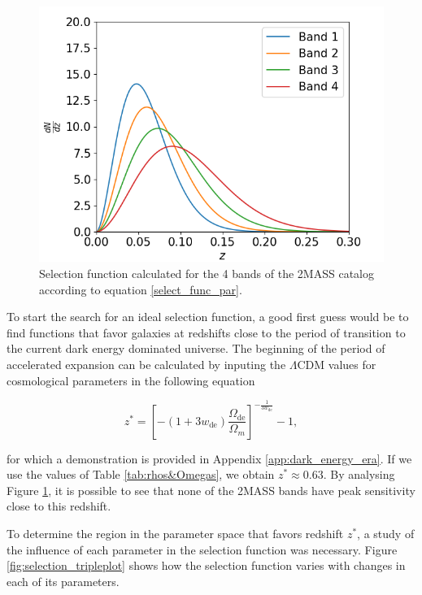 \documentclass[openany,a4paper,12pt,oneside]{book}
\begin{document}
\begin{spacing}{1.5}
\begin{figure}[!htb]
	\centering
	\includegraphics[width=.7\linewidth]{Imagens/selection_2MASS.png}
	\caption{Selection function calculated for the 4 bands of the 2MASS catalog according to equation \eqref{select_func_par}.}
	\label{fig:2MASS_selections}
\end{figure}

To start the search for an ideal selection function, a good first guess would be to find functions that favor galaxies at redshifts close to the period of transition to the current dark energy dominated universe. The beginning of the period of accelerated expansion can be calculated by inputing the $\Lambda$CDM values for cosmological parameters in the following equation

\begin{equation}\label{dark_energy_era_redshift}
	z^*=\left[-(1+3w_\text{de})\frac{\Omega_\text{de}}{\Omega_m}\right]^{-\frac{1}{3w_\text{de}}}-1,
\end{equation}

\noindent for which a demonstration is provided in Appendix \ref{app:dark_energy_era}. If we use the values of Table \ref{tab:rhos&Omegas}, we obtain $z^*\approx 0.63$. By analysing Figure \ref{fig:2MASS_selections}, it is possible to see that none of the 2MASS bands have peak sensitivity close to this redshift.

To determine the region in the parameter space that favors redshift $z^*$, a study of the influence of each parameter in the selection function was necessary. Figure \ref{fig:selection_tripleplot} shows how the selection function varies with changes in each of its parameters.


\end{spacing}
\end{document}
